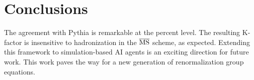 \section{Conclusions}\label{sec:conclusions}

The agreement with Pythia is remarkable at the percent level. The
resulting K-factor is insensitive to hadronization in the $\overline{\rm
MS}$ scheme, as expected. Extending this framework to simulation-based
AI agents is an exciting direction for future work. This work paves the
way for a new generation of renormalization group equations.

